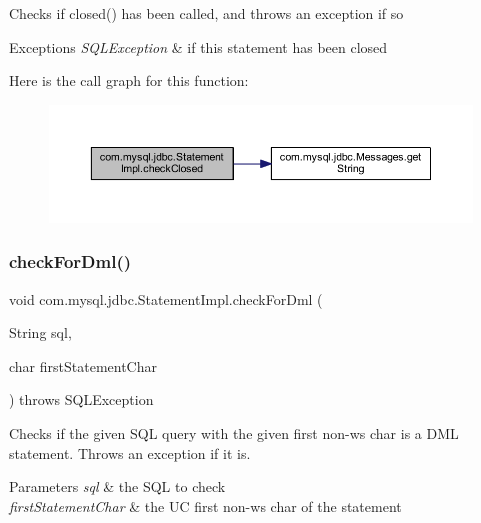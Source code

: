 Checks if closed() has been called, and throws an exception if so


\begin{DoxyExceptions}{Exceptions}
{\em S\+Q\+L\+Exception} & if this statement has been closed \\
\hline
\end{DoxyExceptions}
Here is the call graph for this function\+:
\nopagebreak
\begin{figure}[H]
\begin{center}
\leavevmode
\includegraphics[width=350pt]{classcom_1_1mysql_1_1jdbc_1_1_statement_impl_a88caedee8619aad1351c9edea352c37e_cgraph}
\end{center}
\end{figure}
\mbox{\label{classcom_1_1mysql_1_1jdbc_1_1_statement_impl_a9f707faf90e18c724869f1745933c1df}} 
\subsubsection{\texorpdfstring{check\+For\+Dml()}{checkForDml()}}
{\footnotesize\ttfamily void com.\+mysql.\+jdbc.\+Statement\+Impl.\+check\+For\+Dml (\begin{DoxyParamCaption}\item[{String}]{sql,  }\item[{char}]{first\+Statement\+Char }\end{DoxyParamCaption}) throws S\+Q\+L\+Exception\hspace{0.3cm}{\ttfamily [protected]}}

Checks if the given S\+QL query with the given first non-\/ws char is a D\+ML statement. Throws an exception if it is.


\begin{DoxyParams}{Parameters}
{\em sql} & the S\+QL to check \\
\hline
{\em first\+Statement\+Char} & the UC first non-\/ws char of the statement\\
\hline
\end{DoxyParams}

